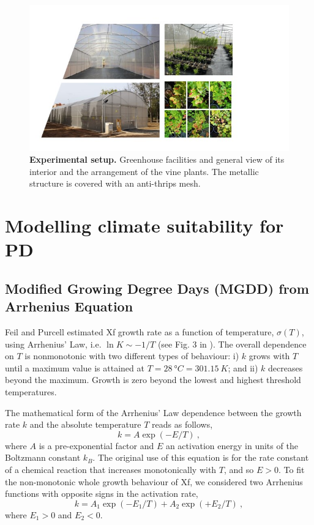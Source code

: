 \begin{figure}[H]
    \centering
    \includegraphics[width=1\textwidth]{Figures/Experimental setup.jpg}
    \caption{\textbf{Experimental setup.} Greenhouse facilities and general
        view of its interior and the arrangement of the vine plants. The
        metallic
        structure is covered with an anti-thrips mesh.}
    \label{fig:experimental_setup} %
\end{figure}

\section{Modelling climate suitability for PD}\label{app:S2}
\subsection{Modified Growing Degree Days (MGDD) from Arrhenius
    Equation}\label{app:MGDD} %

Feil and Purcell estimated Xf growth rate as a function of temperature,
$\sigma(T)$, using Arrhenius’ Law, i.e. $\ln K \sim -1/T$ (see Fig. 3 in
\cite{Feil2001}). The overall dependence on $T$ is nonmonotonic with two
different types of behaviour: i) $k$ grows with $T$ until a maximum value is
attained at $T=\SI{28}{\degree C}=\SI{301.15}{K}$; and ii) $k$ decreases beyond
the maximum. Growth is zero beyond the lowest and highest threshold
temperatures.

The mathematical form of the Arrhenius' Law dependence between the growth
rate $k$ and the absolute temperature $T$ reads as follows,
\begin{equation}
    k = A \exp(-E/T) \ ,
\end{equation}
where $A$ is a pre-exponential factor and $E$ an activation energy in units
of the Boltzmann constant $k_B$. The original use of this equation is for the
rate constant of a chemical reaction that increases monotonically with $T$, and
so $E>0$.  To fit the non-monotonic whole growth behaviour of Xf, we considered
two Arrhenius functions with opposite signs in the activation rate,
\begin{equation}\label{eq: Arrhenius_2}
    k =A_1 \exp(-E_1/T) + A_2 \exp(+E_2/T) \ ,
\end{equation}
where $E_1>0$ and $E_2<0$.\\

